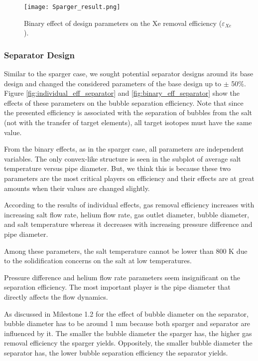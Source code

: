 \begin{itemize}
    \begin{figure}[htbp!]
        \begin{center}
            \texttt{[image: Sparger\_result.png]}
        \end{center}
        \caption{Binary effect of design parameters on the Xe removal 
            efficiency ($\varepsilon$$_{Xe}$).}
        \label{fig:binary_eff_sparger}
    \end{figure}

\FloatBarrier

\subsubsection{Separator Design}

    Similar to the sparger case, we sought potential separator designs around 
    its base design and changed the considered parameters of the base design up 
    to $\pm$ 50\%. Figure \ref{fig:individual_eff_separator} and 
    \ref{fig:binary_eff_separator} show the effects of these parameters on the 
    bubble separation efficiency. Note that since the presented efficiency is 
    associated with the separation of bubbles from the salt (not with the 
    transfer of target elements), all target isotopes must have the same value.

    From the binary effects, as in the sparger case, all parameters are 
    independent variables. The only convex-like structure is seen in the 
    subplot of average salt temperature versus pipe diameter. But, we think 
    this is because these two parameters are the most critical players on 
    efficiency and their effects are at great amounts when their values are 
    changed slightly.

    According to the results of individual effects, gas removal efficiency 
    increases with increasing salt flow rate, helium flow rate, gas outlet 
    diameter, bubble diameter, and salt temperature whereas it decreases with 
    increasing pressure difference and pipe diameter.

    Among these parameters, the salt temperature cannot be lower than 800 K due 
    to the solidification concerns on the salt at low temperatures.

    Pressure difference and helium flow rate parameters seem insignificant on 
    the separation efficiency. The most important player is the pipe diameter 
    that directly affects the flow dynamics.

    As discussed in Milestone 1.2 for the effect of bubble diameter on the 
    separator, bubble diameter has to be around 1 mm because both sparger and 
    separator are influenced by it. The smaller the bubble diameter the sparger 
    has, the higher gas removal efficiency the sparger yields. Oppositely, the 
    smaller bubble diameter the separator has, the lower bubble separation 
    efficiency the separator yields.


\end{itemize}
